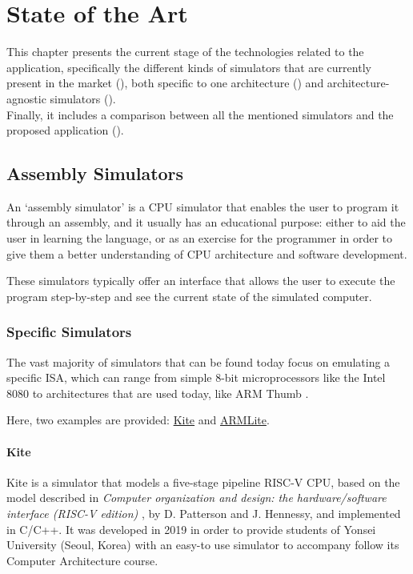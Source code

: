 \chapter{State of the Art}\label{chap:state-of-the-art}
This chapter presents the current stage of the technologies related to the application, specifically the different kinds of simulators that are currently present in the market (), both specific to one architecture () and architecture-agnostic simulators ().\\
Finally, it includes a comparison between all the mentioned simulators and the proposed application ().



\section{Assembly Simulators}\label{sec:assembly-simulators}
An `\gls{assembly simulator}' is a CPU simulator that enables the user to program it through an \gls{assembly}, and it usually has an educational purpose: either to aid the user in learning the language, or as an exercise for the programmer in order to give them a better understanding of CPU architecture and software development.

These simulators typically offer an interface that allows the user to execute the program step-by-step and see the current state of the simulated \gls{computer}.


\subsection{Specific Simulators}\label{subsec:specific-assembly-simulators}
The vast majority of simulators that can be found today focus on emulating a specific \gls{ISA}, which can range from simple 8-bit microprocessors like the Intel 8080 \parencite{i8080emulator} to architectures that are used today, like \gls{ARM} Thumb \parencite{QtARMSim}.

\noindent
Here, two examples are provided: \hyperref[subsubsec:kite]{Kite} and \hyperref[subsubsec:armlite]{ARMLite}.


\subsubsection*{Kite}\label{subsubsec:kite}
Kite \parencite{song_kite2019} is a simulator that models a five-stage \gls{pipeline} \gls{RISC-V} CPU, based on the model described in \textit{Computer organization and design: the hardware/software interface (RISC-V edition)} \parencite{PattersonDavidA.2018Coad}, by D. Patterson and J. Hennessy, and implemented in C/C++. It was developed in 2019 in order to provide students of Yonsei University (Seoul, Korea) with an easy-to use simulator to accompany follow its Computer Architecture course.

